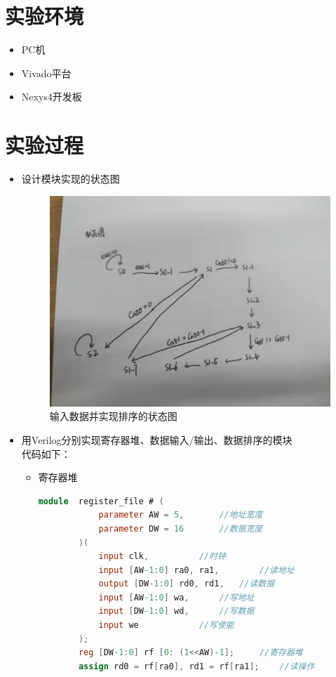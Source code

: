 \documentclass[UTF8,fontset=fandol]{ctexart}
\begin{document}
\section*{实验环境}
\begin{itemize}
  \item PC机
  \item Vivado平台
  \item Nexys4开发板
\end{itemize}
\section*{实验过程}
\begin{itemize}
  \item 设计模块实现的状态图
  \begin{figure}[H]
    \centering
    \includegraphics[scale=0.2]{微信图片_20211202134701.jpg}
    \caption{输入数据并实现排序的状态图}
\end{figure}
  \item 用Verilog分别实现寄存器堆、数据输入/输出、数据排序的模块
      \\代码如下：
  \begin{itemize}
    \item 寄存器堆
    \begin{lstlisting}[language=Verilog,keywordstyle=\color{red!70}]
        module  register_file # (
            parameter AW = 5,		//地址宽度
            parameter DW = 16		//数据宽度
        )(
            input clk,			//时钟
            input [AW-1:0] ra0, ra1,		//读地址
            output [DW-1:0] rd0, rd1,	//读数据
            input [AW-1:0] wa, 		//写地址
            input [DW-1:0] wd,		//写数据
            input we			//写使能
        );
        reg [DW-1:0] rf [0: (1<<AW)-1];		//寄存器堆
        assign rd0 = rf[ra0], rd1 = rf[ra1];	//读操作
            

\end{lstlisting}
\end{itemize}
\end{itemize}
\end{document}
